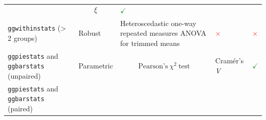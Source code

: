 \documentclass[
]{article}
\begin{document}
\begin{longtable}[]{@{}lllll@{}}
\begin{minipage}[t]{0.31\columnwidth}
\end{minipage} & \begin{minipage}[t]{0.12\columnwidth}\raggedright
\[\xi\]\strut
\end{minipage} & \begin{minipage}[t]{0.07\columnwidth}\raggedright
\textcolor{ForestGreen}{$\checkmark$}\strut
\end{minipage}\tabularnewline
\begin{minipage}[t]{0.20\columnwidth}\raggedright
\texttt{ggwithinstats} (\textgreater{} 2 groups)\strut
\end{minipage} & \begin{minipage}[t]{0.16\columnwidth}\raggedright
Robust\strut
\end{minipage} & \begin{minipage}[t]{0.31\columnwidth}\raggedright
Heteroscedastic one-way repeated measures ANOVA for trimmed means\strut
\end{minipage} & \begin{minipage}[t]{0.12\columnwidth}\raggedright
\textcolor{red}{$\times$}\strut
\end{minipage} & \begin{minipage}[t]{0.07\columnwidth}\raggedright
\textcolor{red}{$\times$}\strut
\end{minipage}\tabularnewline
\begin{minipage}[t]{0.20\columnwidth}\raggedright
\texttt{ggpiestats} and \texttt{ggbarstats} (unpaired)\strut
\end{minipage} & \begin{minipage}[t]{0.16\columnwidth}\raggedright
Parametric\strut
\end{minipage} & \begin{minipage}[t]{0.31\columnwidth}\raggedright
\[\text{Pearson's}~ \chi^2 ~\text{test}\]\strut
\end{minipage} & \begin{minipage}[t]{0.12\columnwidth}\raggedright
Cramér's \emph{V}\strut
\end{minipage} & \begin{minipage}[t]{0.07\columnwidth}\raggedright
\textcolor{ForestGreen}{$\checkmark$}\strut
\end{minipage}\tabularnewline
\begin{minipage}[t]{0.20\columnwidth}\raggedright
\texttt{ggpiestats} and \texttt{ggbarstats} (paired)\strut
\end{minipage} & \begin{minipage}[t]{0.16\columnwidth}\raggedright

\end{minipage}
\end{longtable}
\end{document}
